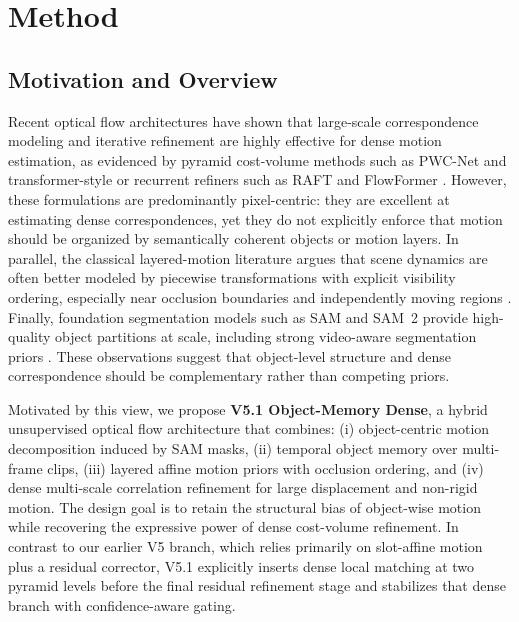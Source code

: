 \section{Method}
\label{sec:method}

\subsection{Motivation and Overview}

Recent optical flow architectures have shown that large-scale correspondence modeling and iterative refinement are highly effective for dense motion estimation, as evidenced by pyramid cost-volume methods such as PWC-Net and transformer-style or recurrent refiners such as RAFT and FlowFormer \cite{sun2018pwcnet,teed2020raft,huang2022flowformer}. However, these formulations are predominantly pixel-centric: they are excellent at estimating dense correspondences, yet they do not explicitly enforce that motion should be organized by semantically coherent objects or motion layers. In parallel, the classical layered-motion literature argues that scene dynamics are often better modeled by piecewise transformations with explicit visibility ordering, especially near occlusion boundaries and independently moving regions \cite{wang1994representing,sevillalara2016optical}. Finally, foundation segmentation models such as SAM and SAM~2 provide high-quality object partitions at scale, including strong video-aware segmentation priors \cite{kirillov2023segment,ravi2024sam2}. These observations suggest that object-level structure and dense correspondence should be complementary rather than competing priors.

Motivated by this view, we propose \textbf{V5.1 Object-Memory Dense}, a hybrid unsupervised optical flow architecture that combines: (i) object-centric motion decomposition induced by SAM masks, (ii) temporal object memory over multi-frame clips, (iii) layered affine motion priors with occlusion ordering, and (iv) dense multi-scale correlation refinement for large displacement and non-rigid motion. The design goal is to retain the structural bias of object-wise motion while recovering the expressive power of dense cost-volume refinement. In contrast to our earlier V5 branch, which relies primarily on slot-affine motion plus a residual corrector, V5.1 explicitly inserts dense local matching at two pyramid levels before the final residual refinement stage and stabilizes that dense branch with confidence-aware gating.

